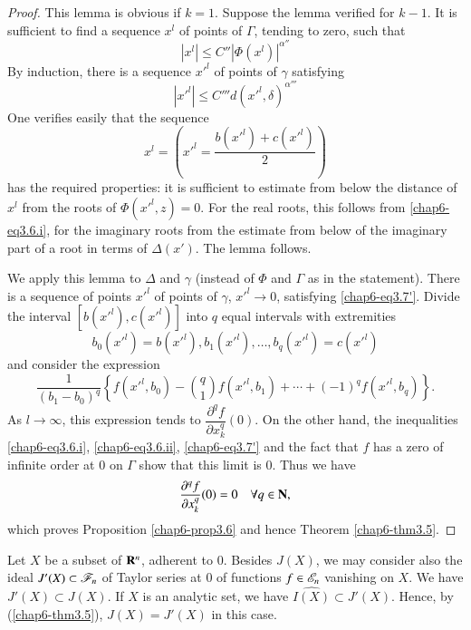 \begin{proof}
This lemma is obvious if $k=1$. Suppose the lemma verified for $k-1$. It is sufficient to find a sequence $x^{l}$ of points of $\Gamma$, tending to zero, such that
$$
|x^{l}|\leq C''|\Phi (x^{l})|^{\alpha''}
$$
By induction, there is a sequence ${x'}^{l}$ of points of $\gamma$ satisfying 
\begin{equation*}
|{x'}^{l}|\leq C''' d({x'}^{l},\delta)^{\alpha'''}\tag{3.7$'$}\label{chap6-eq3.7'}
\end{equation*}
One verifies easily that the sequence
$$
x^{l}=\left({x'}^{l}=\dfrac{b({x'}^{l})+c({x'}^{l})}{2}\right)
$$
has the required properties: it is sufficient to estimate from below the distance of $x^{l}$ from the roots of $\Phi({x'}^{l},z)=0$. For the real roots, this follows from \eqref{chap6-eq3.6.i}, for the imaginary roots from the estimate from below of the imaginary part of a root in terms of $\Delta(x')$. The lemma follows.

We apply this lemma to $\Delta$ and $\gamma$ (instead of $\Phi$ and $\Gamma$ as in the statement). There is a sequence of points ${x'}^{l}$ of points of $\gamma$, ${x'}^{l}\to 0$, satisfying \eqref{chap6-eq3.7'}. Divide the interval $[b({x'}^{l}), c({x'}^{l})]$ into $q$ equal intervals with extremities
$$
b_{0}({x'}^{l})=b({x'}^{l}), b_{1}({x'}^{l}),\ldots,b_{q}({x'}^{l})=c({x'}^{l})
$$
and consider the expression
$$
\dfrac{1}{(b_{1}-b_{0})^{q}}\left\{f({x'}^{l},b_{0})-\binom{q}{1}f({x'}^{l},b_{1})+\cdots+(-1)^{q}f({x'}^{l},b_{q})\right\}.
$$
As $l\to \infty$, this expression tends to $\dfrac{\partial^{q}f}{\partial x^{q}_{k}}(0)$. On the other hand, the inequalities \eqref{chap6-eq3.6.i}, \eqref{chap6-eq3.6.ii}, \eqref{chap6-eq3.7'} and the fact that $f$ has a zero of infinite order at $0$ on $\Gamma$ show that this limit is $0$. Thus we have
$$
\dfrac{\partial^{q}f}{\partial x^{q}_{k}}(0)=0\quad \forall q\in\mathbf{N},
$$
which proves Proposition \ref{chap6-prop3.6} and hence Theorem \ref{chap6-thm3.5}.
\end{proof}

\begin{remark}\label{chap6-rem3.8}
Let $X$ be a subset of $\mathbf{R}^{n}$, adherent to $0$. Besides $J(X)$, we may consider also the ideal $J'(X)\subset \mathscr{F}_{n}$ of Taylor series at $0$ of functions $f\in\mathscr{E}_{n}$ vanishing on $X$. We have $J'(X)\subset J(X)$. If $X$ is an analytic set, we have $\widehat{I(X)}\subset J'(X)$. Hence, by (\ref{chap6-thm3.5}), $J(X)=J'(X)$ in this case.
\end{remark}

